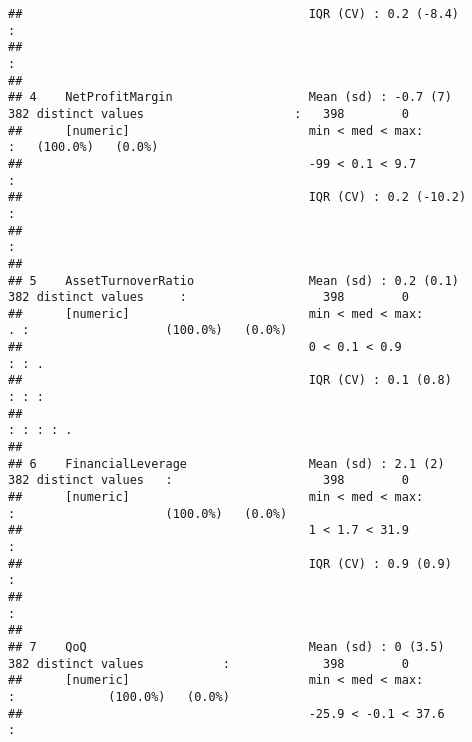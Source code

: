 \documentclass[
]{article}
\begin{document}
\begin{verbatim}
##                                        IQR (CV) : 0.2 (-8.4)                                             :                       
##                                                                                                          :                       
## 
## 4    NetProfitMargin                   Mean (sd) : -0.7 (7)      382 distinct values                     :   398        0        
##      [numeric]                         min < med < max:                                                  :   (100.0%)   (0.0%)   
##                                        -99 < 0.1 < 9.7                                                   :                       
##                                        IQR (CV) : 0.2 (-10.2)                                            :                       
##                                                                                                          :                       
## 
## 5    AssetTurnoverRatio                Mean (sd) : 0.2 (0.1)     382 distinct values     :                   398        0        
##      [numeric]                         min < med < max:                                . :                   (100.0%)   (0.0%)   
##                                        0 < 0.1 < 0.9                                   : : .                                     
##                                        IQR (CV) : 0.1 (0.8)                            : : :                                     
##                                                                                        : : : : .                                 
## 
## 6    FinancialLeverage                 Mean (sd) : 2.1 (2)       382 distinct values   :                     398        0        
##      [numeric]                         min < med < max:                                :                     (100.0%)   (0.0%)   
##                                        1 < 1.7 < 31.9                                  :                                         
##                                        IQR (CV) : 0.9 (0.9)                            :                                         
##                                                                                        :                                         
## 
## 7    QoQ                               Mean (sd) : 0 (3.5)       382 distinct values           :             398        0        
##      [numeric]                         min < med < max:                                        :             (100.0%)   (0.0%)   
##                                        -25.9 < -0.1 < 37.6                                     :                                 

\end{verbatim}
\end{document}
